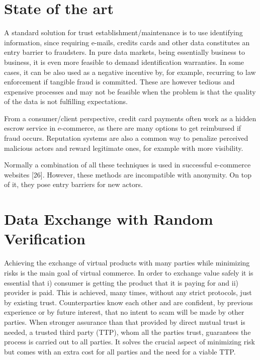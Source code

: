 \documentclass[]{article}
\begin{document}

	\section{State of the art}
	A standard solution for trust establishment/maintenance is to use identifying information, since requiring e-mails, credits cards and other data constitutes an entry barrier to fraudsters. In pure data markets, being essentially business to business, it is even more feasible to demand identification warranties. In some cases, it can be also used as a negative incentive by, for example, recurring to law enforcement if tangible fraud is committed. These are however tedious and expensive processes and may not be feasible when the problem is that the quality of the data is not fulfilling expectations.
	
	From a consumer/client perspective, credit card payments often work as a hidden escrow service in e-commerce, as there are many options to get reimbursed if fraud occurs. Reputation systems are also a common way to penalize perceived malicious actors and reward legitimate ones, for example with more visibility. 

	Normally a combination of all these techniques is used in successful e-commerce websites [26]. However, these methods are incompatible with anonymity. On top of it, they pose entry barriers for new actors.

	\section{Data Exchange with Random Verification}
	Achieving the exchange of virtual products with many parties while minimizing risks is the main goal of virtual commerce. In order to exchange value safely it is essential that i) consumer is getting the product that it is paying for and ii) provider is paid. This is achieved, many times, without any strict protocols, just by existing trust. Counterparties know each other and are confident, by previous experience or by future interest, that no intent to scam will be made by other parties. When stronger assurance than that provided by direct mutual trust is needed, a trusted third party (TTP), whom all the parties trust, guarantees the process is carried out to all parties. It solves the crucial aspect of minimizing risk but comes with an extra cost for all parties and the need for a viable TTP.
	
\end{document}
